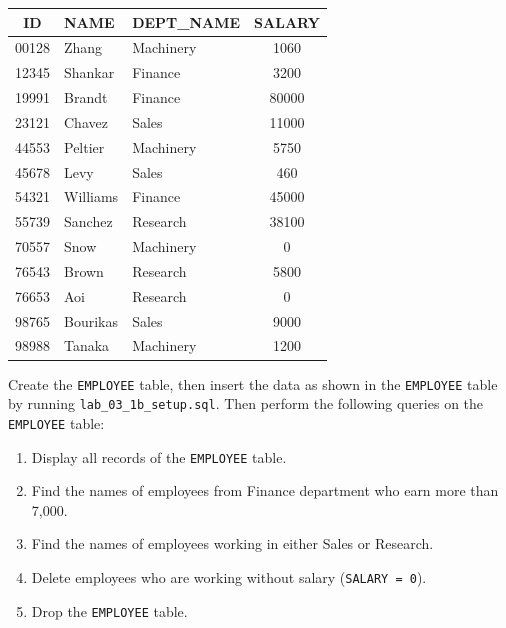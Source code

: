 \documentclass[12pt,a4paper]{article}
\begin{document}
    \begin{table}[h!]\centering
    \begin{tabular}{|c|l|l|c|}
        \hline
        \textbf{ID} & \textbf{NAME} & \textbf{DEPT\_NAME} & \textbf{SALARY} \\ \hline
        00128 & Zhang & Machinery & 1060 \\
        12345 & Shankar & Finance & 3200 \\
        19991 & Brandt & Finance & 80000 \\
        23121 & Chavez & Sales & 11000 \\
        44553 & Peltier & Machinery & 5750 \\
        45678 & Levy & Sales & 460 \\
        54321 & Williams & Finance & 45000 \\
        55739 & Sanchez & Research & 38100 \\ 
        70557 & Snow & Machinery & 0 \\
        76543 & Brown & Research & 5800 \\
        76653 & Aoi & Research & 0 \\
        98765 & Bourikas & Sales & 9000 \\
        98988 & Tanaka & Machinery & 1200 \\ \hline
    \end{tabular}
    \end{table}

\noindent Create the \texttt{EMPLOYEE} table, then insert the data as shown in the \texttt{EMPLOYEE} table by running \texttt{lab\_03\_1b\_setup.sql}. Then perform the following queries on the \texttt{EMPLOYEE} table:
\begin{enumerate}
    \item Display all records of the \texttt{EMPLOYEE} table.
    \item Find the names of employees from Finance department who earn more than 7,000.
    \item Find the names of employees working in either Sales or Research.
    \item Delete employees who are working without salary (\texttt{SALARY = 0}).
    \item Drop the \texttt{EMPLOYEE} table.

\end{enumerate}
\end{document}
